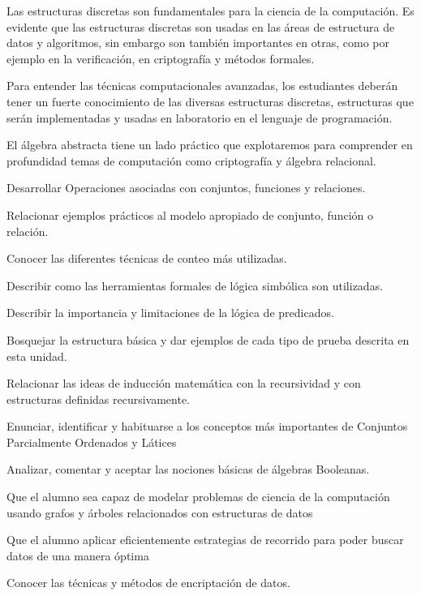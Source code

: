 \begin{sumilla}


\begin{fundamentacion}
Las estructuras discretas son fundamentales para la ciencia de la computaci\'on. Es evidente que las estructuras discretas son usadas en las \'areas de estructura de datos y algoritmos, sin embargo son tambi\'en importantes en otras, como por ejemplo en la verificaci\'on, en criptograf\'ia y m\'etodos formales.

Para entender las t\'ecnicas computacionales avanzadas, los estudiantes deber\'an tener un fuerte conocimiento de las diversas estructuras discretas, estructuras que ser\'an implementadas y usadas en laboratorio en el lenguaje de programaci\'on.

El \'algebra abstracta tiene un lado pr\'actico que explotaremos para comprender en profundidad temas de computaci\'on como criptograf\'ia y \'algebra relacional.
\end{fundamentacion}

\begin{objetivosdelcurso}
\item Desarrollar Operaciones asociadas con conjuntos, funciones y relaciones.
\item Relacionar ejemplos pr\'acticos al modelo apropiado de conjunto, funci\'on o relaci\'on.
\item Conocer las diferentes t\'ecnicas de conteo m\'as utilizadas.
\item Describir como las herramientas formales de l\'ogica simb\'olica son utilizadas.
\item Describir la importancia y limitaciones de la l\'ogica de predicados.
\item Bosquejar la estructura b\'asica y dar ejemplos de cada tipo de prueba descrita en esta unidad.
\item Relacionar las ideas de inducci\'on matem\'atica con la recursividad y con estructuras definidas recursivamente.
\item Enunciar, identificar y habituarse a los conceptos m\'as importantes de Conjuntos Parcialmente Ordenados y L\'atices
\item Analizar, comentar y aceptar las nociones b\'asicas de \'algebras Booleanas.
\item Que el alumno sea capaz de modelar problemas de ciencia de la computaci\'on usando grafos y \'arboles relacionados con estructuras de datos
\item Que el alumno aplicar eficientemente estrategias de recorrido para poder buscar datos de una manera \'optima
\item Conocer las t\'ecnicas y m\'etodos de encriptaci\'on de datos.
\end{objetivosdelcurso}


\end{sumilla}
